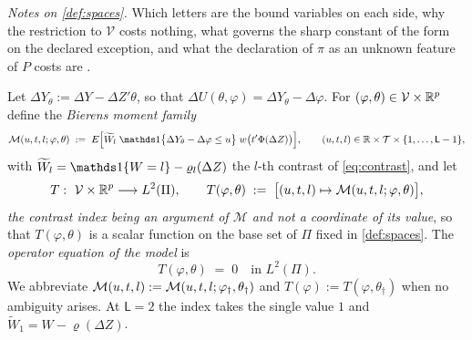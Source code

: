 \noindent\emph{Notes on \cref{def:spaces}.} Which letters are the bound variables on each side, why the
restriction to $\mathcal V$ costs nothing, what governs the sharp constant of the form on the declared
exception, and what the declaration of $\pi$ as an unknown feature of $P$ costs are
.


\begin{definition}\label{def:operator}
Let $\Delta Y_\theta:=\Delta Y-\Delta Z'\theta$, so that $\Delta U(\theta,\varphi)=\Delta Y_\theta-\Delta\varphi$.
For $(\varphi,\theta)\in\mathcal V\times\mathbb{R}^{p}$ define the \emph{Bierens moment family}
\begin{equation}\label{eq:Mdef}
\mathcal M(u,t,l;\varphi,\theta)
\;:=\;E\Big[\widetilde W_l\;\un\big\{\Delta Y_\theta-\Delta\varphi\le u\big\}\;w\big(t'\Phi(\Delta Z)\big)\Big],
\qquad (u,t,l)\in\IR\times\mathcal T\times\{1,\dots,\mathsf L-1\},
\end{equation}
with $\widetilde W_l=\un\{W=l\}-\varrho_l(\Delta Z)$ the $l$-th contrast of \eqref{eq:contrast}, and let
\begin{equation}\label{eq:Tdef}
T:\ \mathcal V\times\mathbb{R}^{p}\longrightarrow L^{2}(\Pi),
\qquad
T(\varphi,\theta)\;:=\;\big[(u,t,l)\mapsto\mathcal M(u,t,l;\varphi,\theta)\big],
\end{equation}
\emph{the contrast index being an argument of $\mathcal M$ and not a coordinate of its value}, so that
$T(\varphi,\theta)$ is a scalar function on the base set of $\Pi$ fixed in \cref{def:spaces}. The
\emph{operator equation of the model} is
\begin{equation}\label{eq:opeq}
T(\varphi,\theta)\;=\;0 \quad\text{in }L^{2}(\Pi).
\end{equation}
We abbreviate $\mathcal M(u,t,l):=\mathcal M(u,t,l;\varphi_{\dagger},\theta_\dagger)$ and
$T(\varphi):=T(\varphi,\theta_\dagger)$ when no ambiguity arises. At $\mathsf L=2$ the index takes
the single value $1$ and $\widetilde W_1=W-\varrho(\Delta Z)$.
\end{definition}

